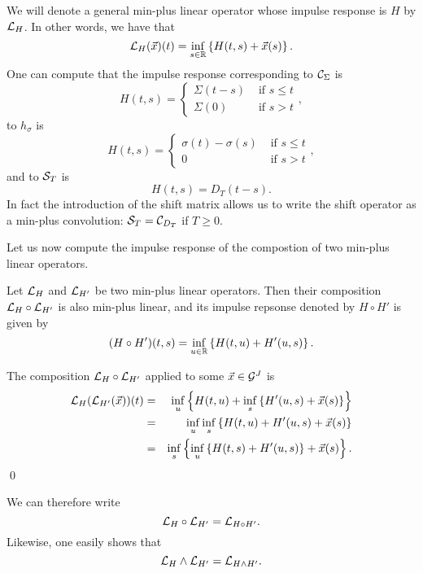 We will denote a general min-plus linear operator whose impulse response is $H$ by $\mathcal L_{H}$.
In other words, we have that
$$ \mathcal L_{H}(\vec{x})(t) = \inf_{s \in \mathbb{R}}  \left\{ H(t,s) + \vec{x}(s) \right\}. $$
One can compute that the impulse response corresponding to $\mathcal C_{\Sigma}$ is
$$ H(t,s) =  \left\{ \begin{array}{ll} \Sigma(t-s)   & \mbox{ if }   s \leq t \\
                                       \Sigma(0)     & \mbox{ if }   s > t      \end{array} \right.  ,      $$
to $h_{\sigma}$ is
$$ H(t,s) = \left\{ \begin{array}{ll} \sigma(t) - \sigma(s) & \mbox{ if } s \leq t \\
                                            0               & \mbox{ if } s > t    \end{array} \right. , $$
and to $\mathcal S_{T}$ is
$$ H(t,s) = D_{T}(t-s). $$
In fact the introduction of the shift matrix allows us to write the shift operator as a min-plus convolution: $\mathcal S_T = \mathcal C_{D_T}$ if $T \geq 0$.

Let us now compute the impulse response of the compostion of two min-plus linear operators.

\begin{theorem}
Let $\mathcal L_{H}$ and  $\mathcal L_{H'}$ be two  min-plus linear operators. Then their composition
$ \mathcal L_{H}  \circ \mathcal L_{H'}$ is also min-plus linear, and its impulse repsonse denoted by $H \circ H'$ is given by
$$ (H \circ H')(t,s) = \inf_{u \in \mathbb{R}} \left\{ H(t,u) + H'(u,s) \right\}. $$
\end{theorem}

\pr The composition $\mathcal L_{H} \circ \mathcal L_{H'}$ applied to some $\vec{x} \in \mathcal G^J$ is
\begin{eqnarray*}
\mathcal L_{H} ( \mathcal L_{H'} (\vec{x} ))(t) &  = &  \inf_{u } \left\{ H(t, u) + \inf_{s} \left\{ H'(u,s) + \vec{x}(s) \right\} \right\} \\
                & = &   \inf_{u} \inf_{s} \left\{ H(t, u) + H'(u,s) + \vec{x}(s) \right\} \\
                & = &   \inf_{s} \left\{ \inf_{u} \left\{ H(t, s) + H'(u,s) \right\} + \vec{x}(s) \right\}.
\end{eqnarray*}
\qed

We can therefore write
$$ \mathcal L_H \circ \mathcal L_{H'} = \mathcal L_{H \circ H'}.$$
Likewise, one easily shows that
$$ \mathcal L_H \wedge \mathcal L_{H'} = \mathcal L_{H \wedge H'}.$$


